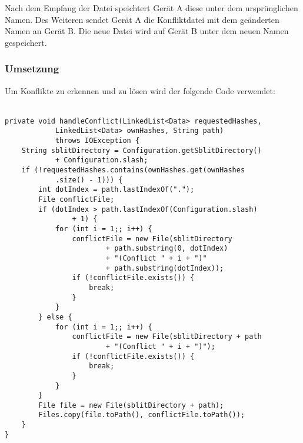 Nach dem Empfang der Datei speichtert Gerät A diese unter dem ursprünglichen Namen. Des Weiteren sendet Gerät A die Konfliktdatei mit dem geänderten Namen an Gerät B. Die neue Datei wird auf Gerät B unter dem neuen Namen gespeichert.

\subsubsection{Umsetzung}
Um Konflikte zu erkennen und zu lösen wird der folgende Code verwendet: \\ \\
\javalisting
\begin{minipage}{\linewidth}
\begin{lstlisting}[caption={Erkennen eines Konflikts},captionpos=b]
private void handleConflict(LinkedList<Data> requestedHashes,
			LinkedList<Data> ownHashes, String path)
			throws IOException {
	String sblitDirectory = Configuration.getSblitDirectory()
			+ Configuration.slash;
	if (!requestedHashes.contains(ownHashes.get(ownHashes
			.size() - 1))) {
		int dotIndex = path.lastIndexOf(".");
		File conflictFile;
		if (dotIndex > path.lastIndexOf(Configuration.slash) 
				+ 1) {
			for (int i = 1;; i++) {
				conflictFile = new File(sblitDirectory
						+ path.substring(0, dotIndex)
						+ "(Conflict " + i + ")"
						+ path.substring(dotIndex));
				if (!conflictFile.exists()) {
					break;
				}
			}
		} else {
			for (int i = 1;; i++) {
				conflictFile = new File(sblitDirectory + path
						+ "(Conflict " + i + ")");
				if (!conflictFile.exists()) {
					break;
				}
			}
		}
		File file = new File(sblitDirectory + path);
		Files.copy(file.toPath(), conflictFile.toPath());
	}
}
\end{lstlisting}
\end{minipage}
